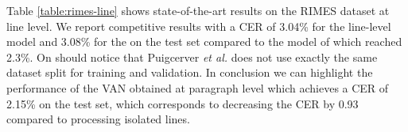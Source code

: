 Table \ref{table:rimes-line} shows state-of-the-art results on the RIMES dataset at line level. We report competitive results with a CER of 3.04\% for the line-level model and 3.08\% for the \modelacc{} on the test set compared to the model of \cite{Puigcerver2017} which reached 2.3\%. On should notice that Puigcerver \textit{et al.} \cite{Puigcerver2017} does not use exactly the same dataset split for training and validation. In conclusion we can highlight the performance of the VAN obtained at paragraph level which achieves a CER of 2.15\% on the test set, which corresponds to decreasing the CER by 0.93 compared to processing isolated lines.
\begin{table}[!h]
    \caption{Comparison with the state of the art on the line-level RIMES dataset.}
    \centering
    \label{table:rimes-line}
\end{table}

